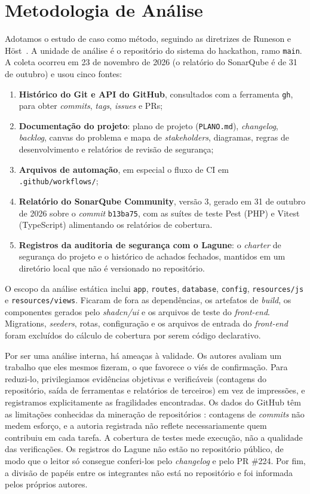 \section{Metodologia de Análise}
\label{sec:met}

Adotamos o estudo de caso como método, seguindo as diretrizes de Runeson e Höst~\cite{runeson2009}. A unidade de análise é o repositório do sistema do hackathon, ramo \texttt{main}. A coleta ocorreu em 23 de novembro de 2026 (o relatório do SonarQube é de 31 de outubro) e usou cinco fontes:

\begin{enumerate}
  \item \textbf{Histórico do Git e API do GitHub}, consultados com a ferramenta \texttt{gh}, para obter \textit{commits}, \textit{tags}, \textit{issues} e PRs;
  \item \textbf{Documentação do projeto}: plano de projeto (\texttt{PLANO.md}), \textit{changelog}, \textit{backlog}, canvas do problema e mapa de \textit{stakeholders}, diagramas, regras de desenvolvimento e relatórios de revisão de segurança;
  \item \textbf{Arquivos de automação}, em especial o fluxo de CI em \texttt{.github/workflows/};
  \item \textbf{Relatório do SonarQube Community}, versão 3, gerado em 31 de outubro de 2026 sobre o \textit{commit} \texttt{b13ba75}, com as suítes de teste Pest (PHP) e Vitest (TypeScript) alimentando os relatórios de cobertura.
  \item \textbf{Registros da auditoria de segurança com o Lagune}: o \textit{charter} de segurança do projeto e o histórico de achados fechados, mantidos em um diretório local que não é versionado no repositório.
\end{enumerate}

O escopo da análise estática inclui \texttt{app}, \texttt{routes}, \texttt{database}, \texttt{config}, \texttt{resources/js} e \texttt{resources/views}. Ficaram de fora as dependências, os artefatos de \textit{build}, os componentes gerados pelo \textit{shadcn/ui} e os arquivos de teste do \textit{front-end}. Migrations, \textit{seeders}, rotas, configuração e os arquivos de entrada do \textit{front-end} foram excluídos do cálculo de cobertura por serem código declarativo.

Por ser uma análise interna, há ameaças à validade. Os autores avaliam um trabalho que eles mesmos fizeram, o que favorece o viés de confirmação. Para reduzi-lo, privilegiamos evidências objetivas e verificáveis (contagens do repositório, saída de ferramentas e relatórios de terceiros) em vez de impressões, e registramos explicitamente as fragilidades encontradas. Os dados do GitHub têm as limitações conhecidas da mineração de repositórios \cite{kalliamvakou2014}: contagens de \textit{commits} não medem esforço, e a autoria registrada não reflete necessariamente quem contribuiu em cada tarefa. A cobertura de testes mede execução, não a qualidade das verificações. Os registros do Lagune não estão no repositório público, de modo que o leitor só consegue conferi-los pelo \textit{changelog} e pelo PR \#224. Por fim, a divisão de papéis entre os integrantes não está no repositório e foi informada pelos próprios autores.
